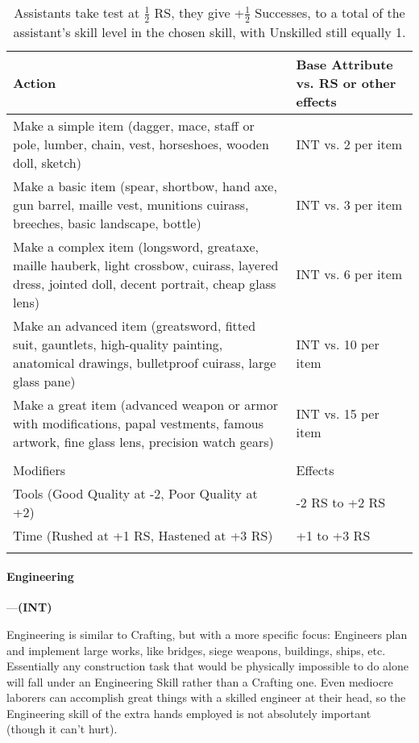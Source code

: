 \documentclass[oneside,11pt,english]{book}
\begin{document}
\begin{longtabu} to \linewidth{X[1.5]X[r]}
	\caption{Crafting}
	\label{tab:Crafting}\\
		\rowfont[c]{}Action &Base Attribute vs. RS or other effects\\\toprule
Make a simple item (dagger, mace, staff or pole, lumber, chain, vest, horseshoes, wooden doll, sketch)&INT vs. 2 per item\\
Make a basic item (spear, shortbow, hand axe, gun barrel, maille vest, munitions cuirass, breeches, basic landscape, bottle) &INT vs. 3 per item\\
Make a complex item (longsword, greataxe, maille hauberk, light crossbow, cuirass, layered dress, jointed doll, decent portrait, cheap glass lens) &INT vs. 6 per item\\
Make an advanced item (greatsword, fitted suit, gauntlets, high-quality painting, anatomical drawings, bulletproof cuirass, large glass pane) &INT vs. 10 per item\\
Make a great item (advanced weapon or armor with modifications, papal vestments, famous artwork, fine glass lens, precision watch gears) &INT vs. 15 per item\\
	\\
		\rowfont[c]{}Modifiers & Effects\\\cmidrule(lr){1-2}
Tools (Good Quality at -2, Poor Quality at +2) &-2 RS to +2 RS \\
Time (Rushed at +1 RS, Hastened at +3 RS) &+1 to +3 RS\\
\caption*{Assistants take test at $ \frac{1}{2} $ RS, they give +$ \frac{1}{2} $ Successes, to a total of the assistant’s skill level in the chosen skill, with Unskilled still equally 1.}
\end{longtabu}

\paragraph{\label{skill:Engineering}Engineering}---\quad\textbf{(INT)}\par
Engineering is similar to Crafting, but with a more specific focus: Engineers plan and implement large works, like bridges, siege weapons, buildings, ships, etc. Essentially any construction task that would be physically impossible to do alone will fall under an Engineering Skill rather than a Crafting one. Even mediocre laborers can accomplish great things with a skilled engineer at their head, so the Engineering skill of the extra hands employed is not absolutely important (though it can’t hurt).
\end{document}
